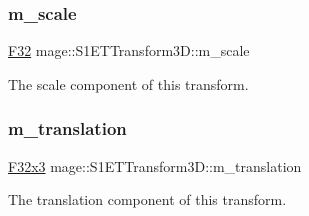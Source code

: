 \subsubsection{\texorpdfstring{m\+\_\+scale}{m\_scale}}
{\footnotesize\ttfamily \mbox{\hyperlink{namespacemage_aa97e833b45f06d60a0a9c4fc22ae02c0}{F32}} mage\+::\+S1\+E\+T\+Transform3\+D\+::m\+\_\+scale\hspace{0.3cm}{\ttfamily [private]}}

The scale component of this transform. \mbox{\label{classmage_1_1_s1_e_t_transform3_d_a0d91962088f646d341ac81415903412a}} 
\subsubsection{\texorpdfstring{m\+\_\+translation}{m\_translation}}
{\footnotesize\ttfamily \mbox{\hyperlink{namespacemage_a1e3c7a882af461f161caa1cbddaf1fa2}{F32x3}} mage\+::\+S1\+E\+T\+Transform3\+D\+::m\+\_\+translation\hspace{0.3cm}{\ttfamily [private]}}

The translation component of this transform. 
